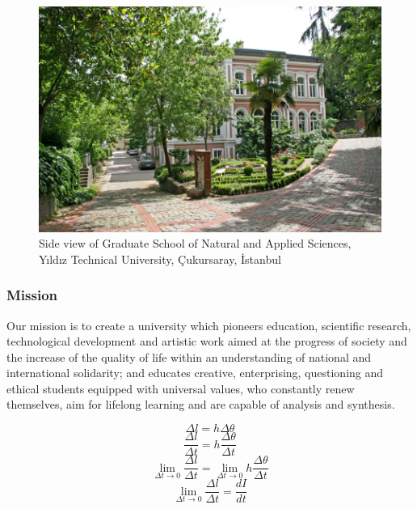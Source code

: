 \begin{figure}[htbp]
\centering
\includegraphics[width=\textwidth]{projectChapters/images/Picture3}
\caption{Side view of Graduate School of Natural and Applied Sciences, Yıldız Technical University, Çukursaray, İstanbul}
\label{fig:ornek2}
\end{figure}

\subsubsection{Mission}
Our mission is to create a university which pioneers education, scientific research, technological development and artistic work aimed at the progress of society and the increase of the quality of life within an understanding of national and international solidarity; and educates creative, enterprising, questioning and ethical students equipped with universal values, who constantly renew themselves, aim for lifelong learning and are capable of analysis and synthesis.

\begin{equation}
\Delta  l = h \Delta \theta
\end{equation}
\begin{equation}
\frac{\Delta l}{\Delta t} = h \frac{\Delta \theta}{\Delta t}
\end{equation}
\begin{equation}
\lim_{\Delta t \rightarrow 0}\frac{\Delta l}{\Delta t} = \lim_{\Delta t \rightarrow 0} h \frac{\Delta \theta}{\Delta t}
\end{equation}
\begin{equation}
\lim_{\Delta t \rightarrow 0}\frac{\Delta l}{\Delta t} = \frac{dI}{dt}
\end{equation}